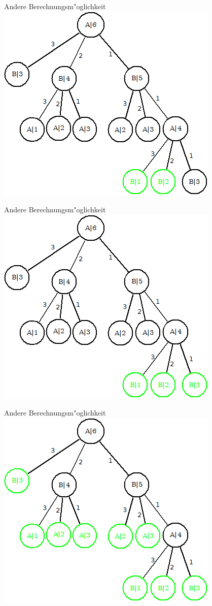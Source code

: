 \documentclass[18pt]{beamer}
\begin{document}
\begin{frame}{Andere Berechnungsm"oglichkeit}
\includegraphics[scale=0.4]{baum2.png}
\end{frame}

\begin{frame}{Andere Berechnungsm"oglichkeit}
\includegraphics[scale=0.4]{baum3.png}
\end{frame}

\begin{frame}{Andere Berechnungsm"oglichkeit}
\includegraphics[scale=0.4]{baum4.png}
\end{frame}
\end{document}
